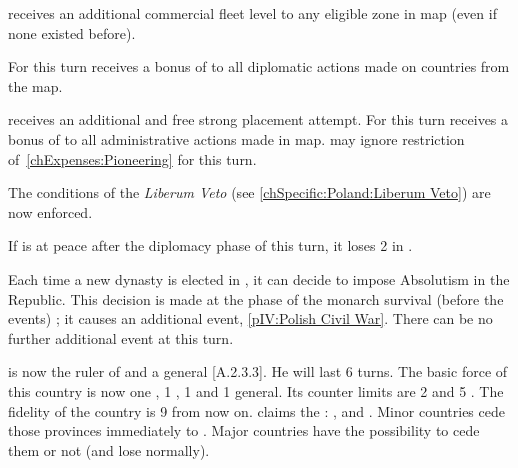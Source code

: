 




\phevnt
\aparag \HOL receives an additional commercial fleet level to any eligible
\STZ zone in \ROTW map (even if none existed before).

\phdipl
\aparag For this turn \HOL receives a bonus of  to all diplomatic
actions made on countries from the \ROTW map.

\phadm
\aparag \HOL receives an additional and free strong \TP placement attempt.
\aparag For this turn \HOL receives a bonus of  to all
administrative actions made in \ROTW map.
\aparag \HOL may ignore restriction of~\ref{chExpenses:Pioneering} for this
turn.





\phevnt
\aparag The conditions of the \textit{Liberum Veto} (see
\ref{chSpecific:Poland:Liberum Veto}) are now enforced.

\phadm
\aparag If \POL is at peace after the diplomacy phase of this turn, it loses 2
in \STAB.

\effetlong
\aparag Each time a new dynasty is elected in \POL, it can decide to impose
Absolutism in the Republic. This decision is made at the phase of the monarch
survival (before the events) ; it causes an additional event, \ref{pIV:Polish
  Civil War}. There can be no further additional event at this turn.





\phevnt
\aparag {} is now the ruler of \paysBrandebourg and a
general [A.2.3.3]. He will last 6 turns.  The basic force of this country is
now one \ARMY\faceplus, 1 \LD, 1 \fortress and 1 general. Its counter limits
are 2 \ARMY and 5 \LD.  The fidelity of the country is 9 from now on.
\aparag \paysBrandebourg claims the :
\provincePreussen,  and \provinceMemel.
\bparag Minor countries cede those provinces immediately to \paysBrandebourg.
\bparag Major countries have the possibility to cede them or not (and lose \PV
normally).

